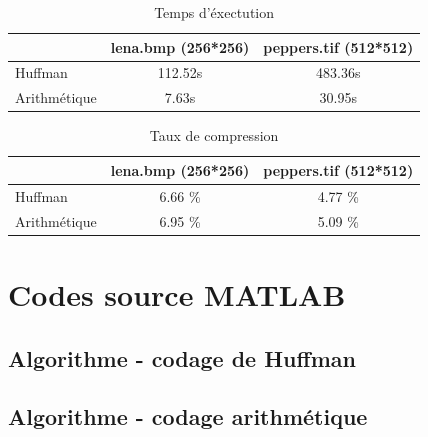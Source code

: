 \documentclass[a4paper, 12pt]{article}
\newcommand{\FSource}[1]{%

}
\begin{document}
\begin{table}[!h]
	\centering
		\begin{tabular}{l|c | c|}
			\cline{2-3}
			                                   & lena.bmp (256*256) & peppers.tif (512*512) \\
			\hline
			\multicolumn{1}{|l|}{Huffman}      & 112.52s            & 483.36s               \\
			\hline
			\multicolumn{1}{|l|}{Arithmétique} & 7.63s              & 30.95s                \\
			\hline
		\end{tabular}
	\caption{Temps d'éxectution}
	\label{tab:TableTempsExec}
\end{table}

\begin{table}[!h]
	\centering
		\begin{tabular}{l|c | c|}
			\cline{2-3}
			                                   & lena.bmp (256*256) & peppers.tif (512*512) \\
			\hline
			\multicolumn{1}{|l|}{Huffman}      & 6.66 \%            & 4.77 \%               \\
			\hline
			\multicolumn{1}{|l|}{Arithmétique} & 6.95 \%            & 5.09 \%               \\
			\hline
		\end{tabular}
	\caption{Taux de compression}
	\label{tab:TableTauxCompress}
\end{table}

\clearpage
\appendix

\section{Codes source MATLAB}
\subsection{Algorithme - codage de Huffman}\label{algohuffman}

\FSource{../huffman.m}

\newpage
\subsection{Algorithme - codage arithmétique}\label{algoarithmetique}

\FSource{../arith.m}
\end{document}
